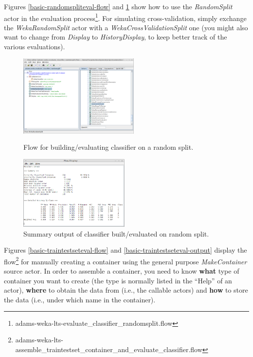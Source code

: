 Figures \ref{basic-randomspliteval-flow} and \ref{basic-randomspliteval-output}
show how to use the \textit{RandomSplit} actor in the evaluation
process\footnote{adams-weka-lts-evaluate\_classifier\_randomsplit.flow}. For
simulating cross-validation, simply exchange the \textit{WekaRandomSplit} actor
with a \textit{WekaCrossValidationSplit} one (you might also want to change from
\textit{Display} to \textit{HistoryDisplay}, to keep better track of the various
evaluations).

\begin{figure}[ht]
  \begin{minipage}[t]{0.5\linewidth}
    \centering
    \includegraphics[width=6.0cm]{images/basic-randomspliteval-flow.png}
    \caption{Flow for building/evaluating classifier on a random split.}
    \label{basic-randomspliteval-flow}
  \end{minipage}
  \hspace{0.5cm}
  \begin{minipage}[t]{0.5\linewidth}
    \centering
    \includegraphics[width=5.5cm]{images/basic-randomspliteval-output.png}
    \caption{Summary output of classifier built/evaluated on random split.}
    \label{basic-randomspliteval-output}
  \end{minipage}
\end{figure}

Figures \ref{basic-traintestseteval-flow} and
\ref{basic-traintestseteval-output} display the flow\footnote{adams-weka-lts-assemble\_traintestset\_container\_and\_evaluate\_classifier.flow}
for manually creating a container using the general purpose
\textit{MakeContainer} source actor. In order to assemble a container, you need
to know \textbf{what} type of container you want to create (the type is normally
listed in the ``Help'' of an actor), \textbf{where} to obtain the data from
(i.e., the callable actors) and \textbf{how} to store the data (i.e., under which
name in the container).


